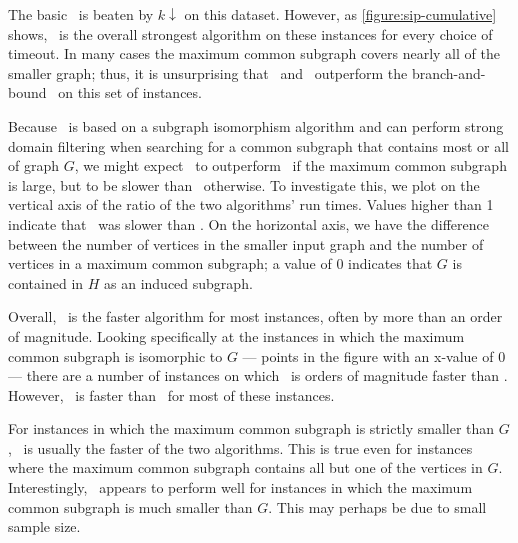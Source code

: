 The basic \McSplit\ is beaten by $k{\downarrow}$ 
\citet{UpcomingAAAIPaper} on this dataset. However, as
\cref{figure:sip-cumulative} shows, \McSplitDown\ is the overall strongest
algorithm on these instances for every choice of timeout.
In many cases the maximum common subgraph covers nearly all of the smaller graph;
thus, it is unsurprising that \kDown\ and \McSplitDown\ outperform the branch-and-bound
\McSplit\ on this set of instances.

Because \kDown\ is based on a subgraph isomorphism algorithm and can perform strong
domain filtering when searching for a common subgraph that contains most or
all of graph $G$, we might expect \kDown\ to outperform \McSplitDown\ if the maximum
common subgraph is large, but to be slower than \McSplitDown\ otherwise.
To investigate this, we plot on the vertical axis of  the ratio of the two
algorithms' run times.  Values higher than 1 indicate that \kDown\ was slower than
\McSplitDown.  On the horizontal axis, we have the difference between the number of
vertices in the smaller input graph and the number of vertices in a maximum
common subgraph; a value of 0 indicates that $G$ is contained in $H$ as an induced subgraph.

Overall, \McSplitDown\ is the faster algorithm for most instances, often by more than
an order of magnitude.  Looking specifically at the instances in which the maximum common
subgraph is isomorphic to $G$ --- points in the figure with an x-value of 0 ---
there are a number of instances on which \kDown\ is orders of magnitude faster than \McSplitDown.  However,
\McSplitDown\ is faster than \kDown\ for most of these instances.

For instances in which the maximum common subgraph is strictly smaller than $G$,
\McSplitDown\ is usually the faster of the two algorithms.  This is true even for instances
where the maximum common subgraph contains all but one of the vertices in $G$.
Interestingly, \kDown\ appears to perform well for instances in which the maximum
common subgraph is much smaller than $G$.  This may perhaps be due to small
sample size.

